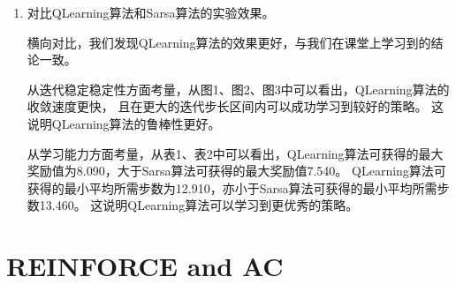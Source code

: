 \documentclass[12pt, a4paper]{article}
\begin{document}
\begin{enumerate}
        固定随机数种子为42，分别取迭代步长为0.001，0.005，0.01，0.05，0.1，0.5，1，5，10，进行训练和测试。
        在训练过程中，QLearning和Sarsa算法在不同迭代步长下的奖励值变化情况如图1，图2，图3所示。

        在测试中，QLearning和Sarsa算法在不同迭代步长下的最终奖励值、完成任务所需的平均步数和算法迭代稳定性情况如表1、表2所示。

        可以看出，QLearning和Sarsa算法均对迭代步长有较高的要求，在小于0.05或大于0.5的迭代步长下均无法学习到较好的策略。

        在迭代步长等于0.5时，QLearning算法能够取得最好的效果，
        获得的最终奖励值为8.090（最大），完成任务所需的平均步数为12.910（最少），收敛情况稳定（在2000个episode后收敛）。

        在迭代步长等于0.05时，Sarsa算法能够取得最好的效果，
        获得的最终奖励值为7.540（最大），完成任务所需的平均步数为13.460（最少），收敛情况稳定（在3000个episode后收敛）。

    \item 对比QLearning算法和Sarsa算法的实验效果。

        横向对比，我们发现QLearning算法的效果更好，与我们在课堂上学习到的结论一致。

        从迭代稳定稳定性方面考量，从图1、图2、图3中可以看出，QLearning算法的收敛速度更快，
        且在更大的迭代步长区间内可以成功学习到较好的策略。
        这说明QLearning算法的鲁棒性更好。

        从学习能力方面考量，从表1、表2中可以看出，QLearning算法可获得的最大奖励值为8.090，大于Sarsa算法可获得的最大奖励值7.540。
        QLearning算法可获得的最小平均所需步数为12.910，亦小于Sarsa算法可获得的最小平均所需步数13.460。
        这说明QLearning算法可以学习到更优秀的策略。

    \end{enumerate}

\section{REINFORCE and AC}
\end{document}

